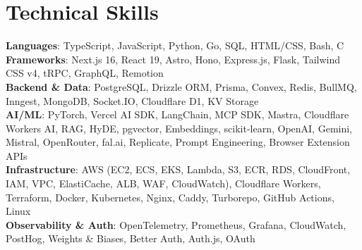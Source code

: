\documentclass[letterpaper,11pt]{article}
\begin{document}
\section{Technical Skills}
 \begin{itemize}[leftmargin=0.15in, label={}]
    \small{\item{
     \textbf{Languages}{: TypeScript, JavaScript, Python, Go, SQL, HTML/CSS, Bash, C} \\
     \textbf{Frameworks}{: Next.js 16, React 19, Astro, Hono, Express.js, Flask, Tailwind CSS v4, tRPC, GraphQL, Remotion} \\
     \textbf{Backend \& Data}{: PostgreSQL, Drizzle ORM, Prisma, Convex, Redis, BullMQ, Inngest, MongoDB, Socket.IO, Cloudflare D1, KV Storage} \\
     \textbf{AI/ML}{: PyTorch, Vercel AI SDK, LangChain, MCP SDK, Mastra, Cloudflare Workers AI, RAG, HyDE, pgvector, Embeddings, scikit-learn, OpenAI, Gemini, Mistral, OpenRouter, fal.ai, Replicate, Prompt Engineering, Browser Extension APIs} \\
     \textbf{Infrastructure}{: AWS (EC2, ECS, EKS, Lambda, S3, ECR, RDS, CloudFront, IAM, VPC, ElastiCache, ALB, WAF, CloudWatch), Cloudflare Workers, Terraform, Docker, Kubernetes, Nginx, Caddy, Turborepo, GitHub Actions, Linux} \\
     \textbf{Observability \& Auth}{: OpenTelemetry, Prometheus, Grafana, CloudWatch, PostHog, Weights \& Biases, Better Auth, Auth.js, OAuth}
    }}
 \end{itemize}


\end{document}
